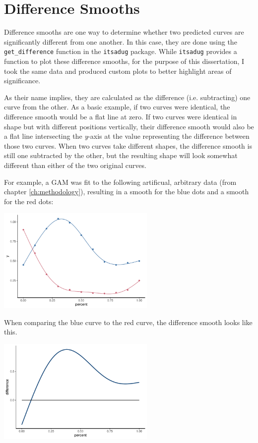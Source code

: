 \chapter{Difference Smooths}
\label{appendix:difference_smooths}

Difference smooths are one way to determine whether two predicted curves are significantly different from one another. In this case, they are done using the \texttt{get\_difference} function in the \texttt{itsadug} package. While \texttt{itsadug} provides a function to plot these difference smooths, for the purpose of this dissertation, I took the same data and produced custom plots to better highlight areas of significance. 

As their name implies, they are calculated as the difference (i.e. subtracting) one curve from the other. As a basic example, if two curves were identical, the difference smooth would be a flat line at zero. If two curves were identical in shape but with different positions vertically, their difference smooth would also be a flat line intersecting the \textit{y}-axis at the value representing the difference between those two curves. When two curves take different shapes, the difference smooth is still one subtracted by the other, but the resulting shape will look somewhat different than either of the two original curves.

For example, a GAM was fit to the following artificual, arbitrary data (from chapter \ref{ch:methodology}), resulting in a smooth for the blue dots and a smooth for the red dots:

\includegraphics[width = 3in]{Figures/example_plots/sample_diff_smooth_data.pdf}

\noindent
When comparing the blue curve to the red curve, the difference smooth looks like this.

\includegraphics[width = 3in]{Figures/example_plots/sample_diff_smooth.pdf}

